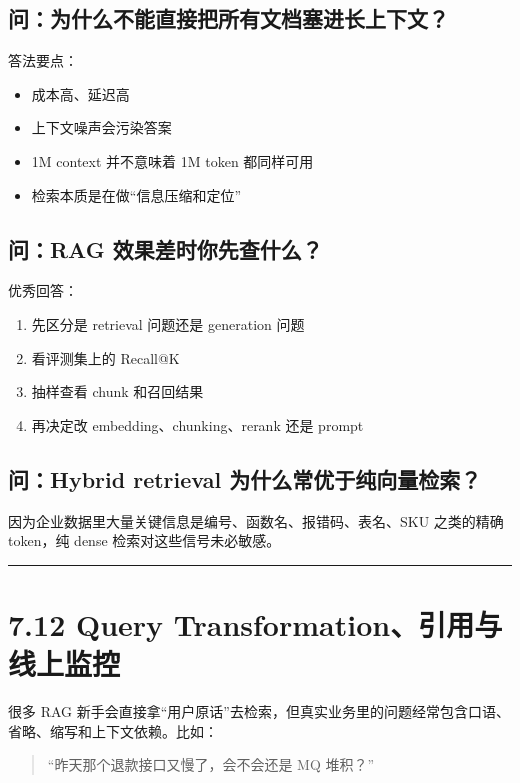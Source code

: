 \subsection{问：为什么不能直接把所有文档塞进长上下文？}

答法要点：


\begin{itemize}[leftmargin=2em]
\item 成本高、延迟高
\item 上下文噪声会污染答案
\item 1M context 并不意味着 1M token 都同样可用
\item 检索本质是在做``信息压缩和定位''
\end{itemize}

\subsection{问：RAG 效果差时你先查什么？}

优秀回答：


\begin{enumerate}[leftmargin=2em]
\item 先区分是 retrieval 问题还是 generation 问题
\item 看评测集上的 Recall@K
\item 抽样查看 chunk 和召回结果
\item 再决定改 embedding、chunking、rerank 还是 prompt
\end{enumerate}

\subsection{问：Hybrid retrieval 为什么常优于纯向量检索？}

因为企业数据里大量关键信息是编号、函数名、报错码、表名、SKU 之类的精确 token，纯 dense 检索对这些信号未必敏感。


\bigskip\hrule\bigskip

\section{7.12 Query Transformation、引用与线上监控}

很多 RAG 新手会直接拿``用户原话''去检索，但真实业务里的问题经常包含口语、省略、缩写和上下文依赖。比如：


\begin{quote}
``昨天那个退款接口又慢了，会不会还是 MQ 堆积？''\\
\end{quote}

